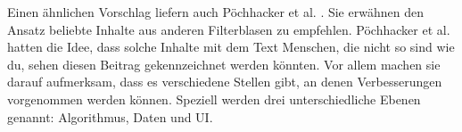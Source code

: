 Einen ähnlichen Vorschlag liefern auch Pöchhacker et al. \cite{rundfunk}.
Sie erwähnen den Ansatz beliebte Inhalte aus anderen Filterblasen zu empfehlen.
Pöchhacker et al. hatten die Idee, dass solche Inhalte mit dem Text \glqq Menschen, die nicht so sind wie du, sehen diesen Beitrag\grqq{} gekennzeichnet werden könnten.
Vor allem machen sie darauf aufmerksam, dass es verschiedene Stellen gibt, an denen Verbesserungen vorgenommen werden können.
Speziell werden drei unterschiedliche Ebenen genannt: Algorithmus, Daten und UI.
